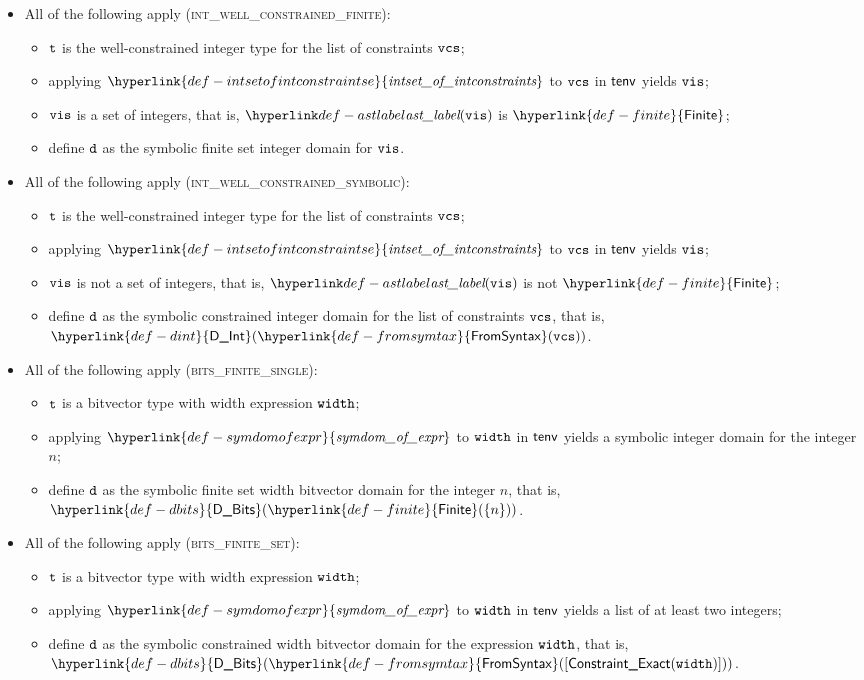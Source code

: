 \documentclass{book}
\newcommand\DInt[0]{\hyperlink{def-dint}{\textsf{D\_Int}}}
\newcommand\DBits[0]{\hyperlink{def-dbits}{\textsf{D\_Bits}}}
\newcommand\Finite[0]{\hyperlink{def-finite}{\textsf{Finite}}}
\newcommand\FromSyntax[0]{\hyperlink{def-fromsymtax}{\textsf{FromSyntax}}}
\newcommand\symdomofexpr[0]{\hyperlink{def-symdomofexpr}{\textfunc{symdom\_of\_expr}}}
\newcommand\intsetofintconstraints[0]{\hyperlink{def-intsetofintconstraintse}{\textfunc{intset\_of\_intconstraints}}}
\begin{document}
\begin{itemize}
  \item All of the following apply (\textsc{int\_well\_constrained\_finite}):
  \begin{itemize}
    \item $\texttt{t}$ is the well-constrained integer type for the list of constraints $\texttt{vcs}$;
    \item applying $\intsetofintconstraints$ to $\texttt{vcs}$ in $\textsf{tenv}$ yields $\texttt{vis}$;
    \item $\texttt{vis}$ is a set of integers, that is, $\astlabel(\vis)$ is $\Finite$;
    \item define $\texttt{d}$ as the symbolic finite set integer domain for $\texttt{vis}$.
  \end{itemize}

  \item All of the following apply (\textsc{int\_well\_constrained\_symbolic}):
  \begin{itemize}
    \item $\texttt{t}$ is the well-constrained integer type for the list of constraints $\texttt{vcs}$;
    \item applying $\intsetofintconstraints$ to $\texttt{vcs}$ in $\textsf{tenv}$ yields $\texttt{vis}$;
    \item $\texttt{vis}$ is not a set of integers, that is, $\astlabel(\vis)$ is not $\Finite$;
    \item define $\texttt{d}$ as the symbolic constrained integer domain for the list of constraints $\texttt{vcs}$, that is, $\DInt(\FromSyntax(\vcs))$.
  \end{itemize}

  \item All of the following apply (\textsc{bits\_finite\_single}):
  \begin{itemize}
    \item $\texttt{t}$ is a bitvector type with width expression $\texttt{width}$;
    \item applying $\symdomofexpr$ to $\texttt{width}$ in $\textsf{tenv}$ yields a symbolic integer domain for the integer $n$;
    \item define $\texttt{d}$ as the symbolic finite set width bitvector domain for the integer $n$, that is, \\
          $\DBits(\Finite(\{n\}))$.
  \end{itemize}

  \item All of the following apply (\textsc{bits\_finite\_set}):
  \begin{itemize}
    \item $\texttt{t}$ is a bitvector type with width expression $\texttt{width}$;
    \item applying $\symdomofexpr$ to $\texttt{width}$ in $\textsf{tenv}$ yields a list of at least two integers;
    \item define $\texttt{d}$ as the symbolic constrained width bitvector domain for the expression $\texttt{width}$, that is, $\DBits(\FromSyntax([\ConstraintExact(\width)]))$.
  \end{itemize}


\end{itemize}
\end{document}
